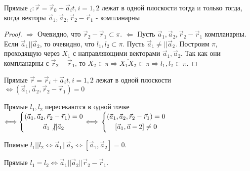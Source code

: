 \begin{proposition}
	Прямые \(_i: \vec r = \vec r_0 + \vec a_it, i = 1, 2\) лежат в одной плоскости тогда и только тогда, когда векторы \(\vec a_1, \vec a_2, \vec r_2 - \vec r_1\) - компланарны
\end{proposition}
\begin{proof}
	\(\Longrightarrow\) Очевидно, что \(\vec r_2-\vec r_1 \subset \pi\).\newline
	\(\Longleftarrow\) Пусть \(\vec a_1, \vec a_2, \vec r_2 - \vec r_1\) компланарны. Если \(\vec a_1 || \vec a_2\), то очевидно, что \(l_1, l_2 \subset \pi\). \newline
	Пусть \(\vec a_1 \ne || \vec a_2\). Построим \(\pi\), проходящую через \(X_1\) с направляющими векторами \(\vec a_1, \vec a_2\). Так как они компланарны с \(\vec r_2 - \vec r_1\), то \(X_2\in\pi\Longrightarrow \overline{X_1X_2}\subset \pi \Longrightarrow l_1, l_2\subset \pi\).
\end{proof}
\begin{corollary}
	Прямые \(\vec r = \vec r_i + \vec a_it, i = 1, 2\) лежат в одной плоскости \(\Longleftrightarrow (\vec a_1, \vec a_2, \vec r_2 - \vec r_1) = 0\)
\end{corollary}
\begin{corollary}
	Прямые \(l_1, l_2\) пересекаются в одной точке \(\Longleftrightarrow \left\{\begin{gathered}
		(\vec a_1, \vec a_2, \vec r_2 - \vec r_1) = 0 \\
		\vec a_1 \not||\vec a_2
	\end{gathered}\right.\Longleftrightarrow\newline \left\{\begin{gathered}
		(\vec a_1, \vec a_2, \vec r_2 - \vec r_1) = 0 \\
		[\vec a_1, \vec a-2]\ne0
	\end{gathered}\right.\)
\end{corollary}
\begin{corollary}
	Ппямые \(l_1||l_2 \Longleftrightarrow \vec a_1 || \vec a_2 \Longleftrightarrow  [\vec a_1, \vec a_2] = 0\).
\end{corollary}
\begin{corollary}
	Прямые \(l_1 = l_2 \Longleftrightarrow \vec a_1 || \vec a_2 || \vec r_2 - \vec r_1\).
\end{corollary}

